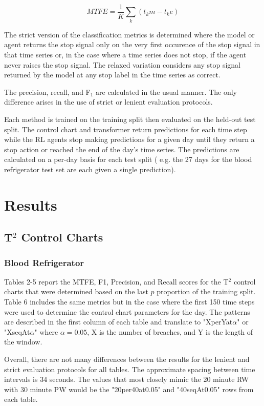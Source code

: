 \documentclass[12pt]{article}
\begin{document}
\begin{equation}
    MTFE = \frac{1}{K}\sum_k (t_km-t_ke)
\end{equation}

The strict version of the classification metrics is determined where the model or agent returns the stop signal only on the
very first occurence of the stop signal in that time series or, in the case where a time series does not stop, if the agent
never raises the stop signal. The relaxed variation considers any stop signal returned by the model at any stop label
in the time series as correct.

The precision, recall, and F$_1$ are calculated in the usual manner. The only difference arises in the use of strict or 
lenient evaluation protocols.

Each method is trained on the training split then evaluated on the held-out test split. The control chart and transformer
return predictions for each time step while the RL agents stop making predictions for a given day until they return a stop
action or reached the end of the day's time series. The predictions are calculated on a per-day basis for each test split (
e.g. the 27 days for the blood refrigerator test set are each given a single prediction).


\section{Results}

\subsection{T$^2$ Control Charts}

\subsubsection{Blood Refrigerator}

Tables 2-5 report the MTFE, F1, Precision, and Recall scores for the T$^2$ control charts that were determined based on the
last $p$ proportion of the training split. Table 6 includes the same metrics but in the case where the first 150 time steps
were used to determine the control chart parameters for the day. The patterns are described in the first column of each table
and translate to "XperYat$\alpha$" or "XseqAt$\alpha$" where $\alpha=0.05$, X is the number of breaches, and Y is the length
of the window.

Overall, there are not many differences between the results for the lenient and strict evaluation protocols for all tables.
The approximate spacing between time intervals is 34 seconds. The values that most closely mimic the 20 minute RW with 30
minute PW would be the "20per40at0.05" and "40seqAt0.05" rows from each table.
\end{document}
